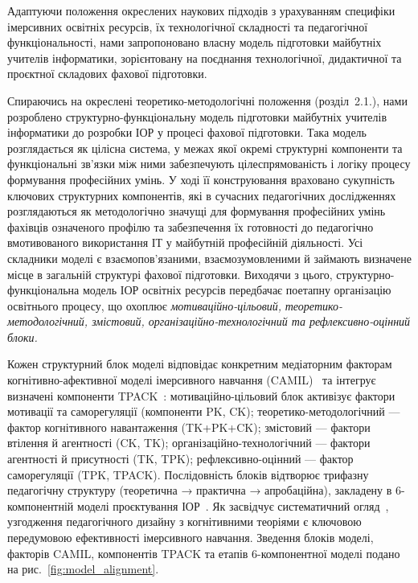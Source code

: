 Адаптуючи положення окреслених наукових підходів з урахуванням специфіки імерсивних освітніх ресурсів, їх технологічної складності та педагогічної функціональності, нами запропоновано власну модель підготовки майбутніх учителів інформатики, зорієнтовану на поєднання технологічної, дидактичної та проєктної складових фахової підготовки.

Спираючись на окреслені теоретико-методологічні положення (розділ~2.1.), нами розроблено структурно-функціональну модель підготовки майбутніх учителів інформатики до розробки ІОР у процесі фахової підготовки. Така модель розглядається як цілісна система, у межах якої окремі структурні компоненти та функціональні зв'язки між ними забезпечують цілеспрямованість і логіку процесу формування професійних умінь. У ході її конструювання враховано сукупність ключових структурних компонентів, які в сучасних педагогічних дослідженнях розглядаються як методологічно значущі для формування професійних умінь фахівців означеного профілю та забезпечення їх готовності до педагогічно вмотивованого використання ІТ у майбутній професійній діяльності. Усі складники моделі є взаємопов'язаними, взаємозумовленими й займають визначене місце в загальній структурі фахової підготовки. Виходячи з цього, структурно-функціональна модель ІОР освітніх ресурсів передбачає поетапну організацію освітнього процесу, що охоплює \emph{мотиваційно-цільовий,} \emph{теоретико-методологічний, змістовий, організаційно-технологічний та рефлексивно-оцінний блоки.}

Кожен структурний блок моделі відповідає конкретним медіаторним факторам когнітивно-афективної моделі імерсивного навчання (CAMIL)~\cite{Makransky2021CAMIL} та інтегрує визначені компоненти TPACK~\cite{Gurevych2015Integration}: мотиваційно-цільовий блок активізує фактори мотивації та саморегуляції (компоненти PK, CK); теоретико-методологічний --- фактор когнітивного навантаження (TK+PK+CK); змістовий --- фактори втілення й агентності (CK, TK); організаційно-технологічний --- фактори агентності й присутності (TK, TPK); рефлексивно-оцінний --- фактор саморегуляції (TPK, TPACK). Послідовність блоків відтворює трифазну педагогічну структуру (теоретична → практична → апробаційна), закладену в 6-компонентній моделі проєктування ІОР~\cite{Semerikov2022IERDesign}. Як засвідчує систематичний огляд~\cite{Mallek2024SynthesizingVR}, узгодження педагогічного дизайну з когнітивними теоріями є ключовою передумовою ефективності імерсивного навчання. Зведення блоків моделі, факторів CAMIL, компонентів TPACK та етапів 6-компонентної моделі подано на рис.~\ref{fig:model_alignment}.


